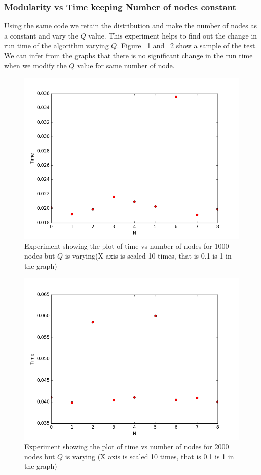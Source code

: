 \subsubsection{Modularity vs Time keeping Number of nodes constant}
Using the same code we retain the distribution and make the number of nodes as a constant and vary the $Q$ value. This experiment helps to find out the change in run time of the algorithm varying $Q$. Figure ~\ref{ex5} and ~\ref{ex6} show a sample of the test. We can infer from the graphs that there is no significant change in the run time when we modify the $Q$ value for same number of node. 
\begin{figure}[H]
\centering
\includegraphics[scale=0.3]{varq.png}
\caption{\label{ex5}Experiment showing the plot of time vs number of nodes for 1000 nodes but $Q$ is varying(X axis is scaled 10 times, that is 0.1 is 1 in the graph) }
\end{figure}

\begin{figure}[H]
\centering
\includegraphics[scale=0.3]{varq2000pio.png}
\caption{\label{ex6}Experiment showing the plot of time vs number of nodes for 2000 nodes but $Q$ is varying (X axis is scaled 10 times, that is 0.1 is 1 in the graph) }
\end{figure}


